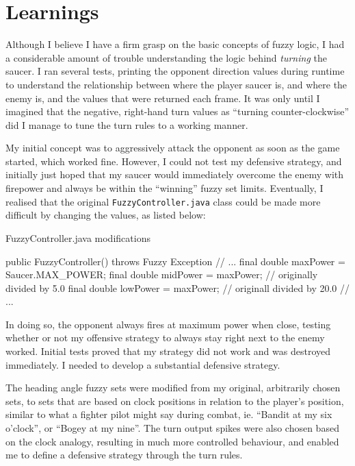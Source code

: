 \newpage

\section{Learnings}

Although I believe I have a firm grasp on the basic concepts of fuzzy logic, I had a considerable amount of trouble understanding the logic behind \emph{turning} the saucer. I ran several tests, printing the opponent direction values during runtime to understand the relationship between where the player saucer is, and where the enemy is, and the values that were returned each frame. It was only until I imagined that the negative, right-hand turn values as ``turning counter-clockwise'' did I manage to tune the turn rules to a working manner.

My initial concept was to aggressively attack the opponent as soon as the game started, which worked fine. However, I could not test my defensive strategy, and initially just hoped that my saucer would immediately overcome the enemy with firepower and always be within the ``winning'' fuzzy set limits. Eventually, I realised that the original \texttt{FuzzyController.java} class could be made more difficult by changing the values, as listed below:

\begin{listing}[H]
\caption{FuzzyController.java modifications}

\begin{javacode}
public FuzzyController() throws Fuzzy Exception {
  // ...
  final double maxPower = Saucer.MAX_POWER;
  final double midPower = maxPower; // originally divided by 5.0
  final double lowPower = maxPower; // originall divided by 20.0
  // ...
}
\end{javacode}
\end{listing}

In doing so, the opponent always fires at maximum power when close, testing whether or not my offensive strategy to always stay right next to the enemy worked. Initial tests proved that my strategy did not work and was destroyed immediately. I needed to develop a substantial defensive strategy.

The heading angle fuzzy sets were modified from my original, arbitrarily chosen sets, to sets that are based on clock positions in relation to the player's position, similar to what a fighter pilot might say during combat, ie. ``Bandit at my six o'clock'', or ``Bogey at my nine''. The turn output spikes were also chosen based on the clock analogy, resulting in much more controlled behaviour, and enabled me to define a defensive strategy through the turn rules.

